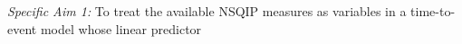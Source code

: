 \emph{Specific Aim 1:} To treat the available NSQIP measures as variables in a time-to-event model whose linear predictor 